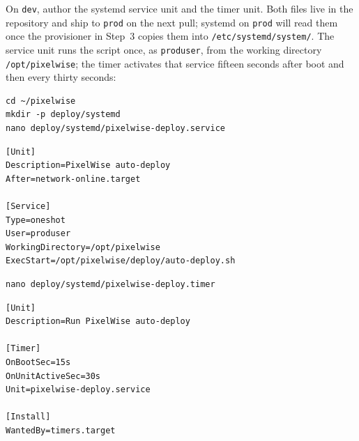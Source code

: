 On \texttt{dev}, author the systemd service unit and the timer unit.
Both files live in the repository and ship to \texttt{prod} on the
next pull; systemd on \texttt{prod} will read them once the
provisioner in Step~3 copies them into \texttt{/etc/systemd/system/}.
The service unit runs the script once, as \texttt{produser}, from
the working directory \texttt{/opt/pixelwise}; the timer activates
that service fifteen seconds after boot and then every thirty seconds:

\begin{verbatim}
cd ~/pixelwise
mkdir -p deploy/systemd
nano deploy/systemd/pixelwise-deploy.service
\end{verbatim}

\begin{verbatim}
[Unit]
Description=PixelWise auto-deploy
After=network-online.target

[Service]
Type=oneshot
User=produser
WorkingDirectory=/opt/pixelwise
ExecStart=/opt/pixelwise/deploy/auto-deploy.sh
\end{verbatim}


\begin{verbatim}
nano deploy/systemd/pixelwise-deploy.timer
\end{verbatim}

\begin{verbatim}
[Unit]
Description=Run PixelWise auto-deploy

[Timer]
OnBootSec=15s
OnUnitActiveSec=30s
Unit=pixelwise-deploy.service

[Install]
WantedBy=timers.target
\end{verbatim}







